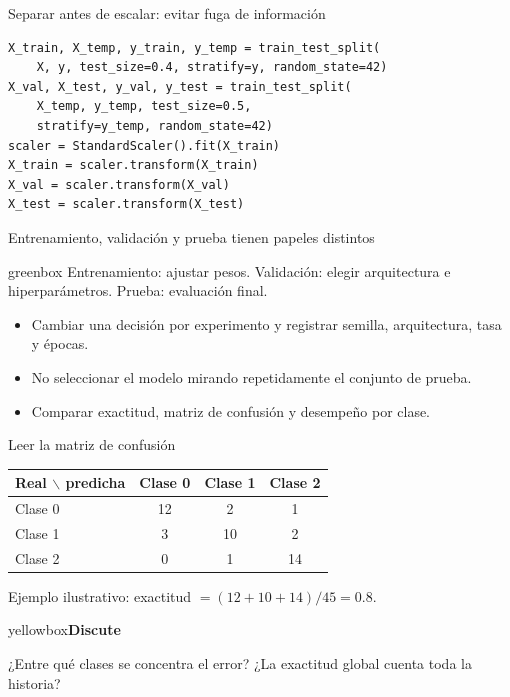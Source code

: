\documentclass[10pt,aspectratio=169,xcolor={dvipsnames}]{beamer}
\newenvironment{caja}[1][lgraybox]{\begin{beamercolorbox}[sep=0.7em,wd=\linewidth]{#1}}{\end{beamercolorbox}}
\newcommand{\actividad}[2]{\begin{caja}[yellowbox]\textbf{#1}\par\smallskip #2\end{caja}}
\begin{document}
\begin{frame}[fragile]{Separar antes de escalar: evitar fuga de información}
\begin{lstlisting}
X_train, X_temp, y_train, y_temp = train_test_split(
    X, y, test_size=0.4, stratify=y, random_state=42)
X_val, X_test, y_val, y_test = train_test_split(
    X_temp, y_temp, test_size=0.5,
    stratify=y_temp, random_state=42)
scaler = StandardScaler().fit(X_train)
X_train = scaler.transform(X_train)
X_val = scaler.transform(X_val)
X_test = scaler.transform(X_test)
\end{lstlisting}

\end{frame}

\begin{frame}{Entrenamiento, validación y prueba tienen papeles distintos}
\begin{caja}[greenbox]
Entrenamiento: ajustar pesos. Validación: elegir arquitectura e hiperparámetros. Prueba: evaluación final.
\end{caja}
\begin{itemize}
\item Cambiar una decisión por experimento y registrar semilla, arquitectura, tasa y épocas.
\item No seleccionar el modelo mirando repetidamente el conjunto de prueba.
\item Comparar exactitud, matriz de confusión y desempeño por clase.
\end{itemize}
\note{}
\end{frame}

\begin{frame}{Leer la matriz de confusión}
\centering
\begin{tabular}{lccc}\toprule
Real $\backslash$ predicha & Clase 0 & Clase 1 & Clase 2\\\midrule
Clase 0 & 12 & 2 & 1\\Clase 1 & 3 & 10 & 2\\Clase 2 & 0 & 1 & 14\\\bottomrule
\end{tabular}\par\bigskip\raggedright
Ejemplo ilustrativo: exactitud $=(12+10+14)/45=0.8$.
\actividad{Discute}{¿Entre qué clases se concentra el error? ¿La exactitud global cuenta toda la historia?}
\note{}
\end{frame}
\end{document}
